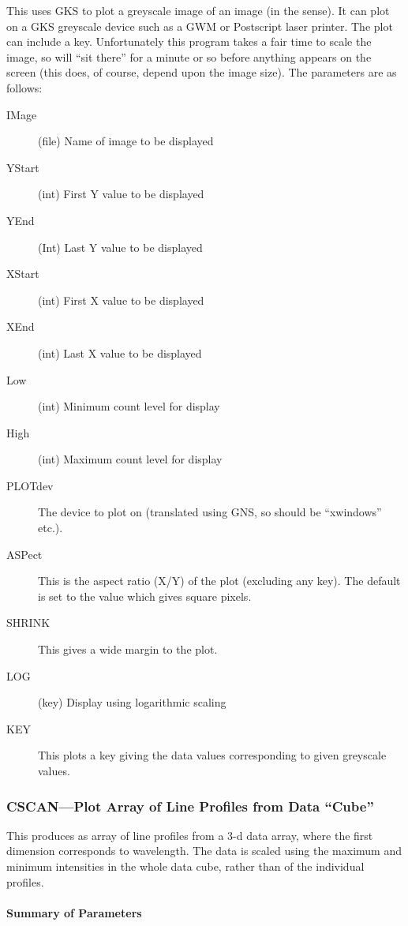 This uses GKS to plot a greyscale image of an image (in the 
sense). It can plot on a GKS greyscale device such as a GWM or
Postscript laser printer.
The plot can include a key. Unfortunately this
program takes a fair time to scale the image, so will ``sit there''
for a minute or so before anything appears on the screen (this does, of
course, depend upon the image size). The parameters are as follows:
\begin{description}
\item[IMage] (file) Name of image to be displayed 
\item[YStart] (int) First Y value to be displayed 
\item[YEnd] (Int) Last Y value to be displayed 
\item[XStart] (int) First X value to be displayed 
\item[XEnd] (int) Last X value to be displayed 
\item[Low] (int) Minimum count level for display 
\item[High] (int) Maximum count level for display 
\item[PLOTdev] The device to plot on (translated using GNS, so
should be ``xwindows'' etc.).
\item[ASPect] This is the aspect ratio (X/Y) of the plot (excluding
any key). The default is set to the value which gives square pixels.
\item[SHRINK] This gives a wide margin to the plot.
\item[LOG] (key) Display using logarithmic scaling 
\item[KEY] This plots a key giving the data values corresponding to
given greyscale values.
\end{description}

\subsubsection{CSCAN---Plot Array of Line Profiles from Data ``Cube''}

This produces as array of line profiles from a 3-d data array, where
the first dimension corresponds to wavelength. The data is scaled using
the maximum and minimum intensities in the whole data cube, rather than
of the individual profiles.

\paragraph{Summary of Parameters}

